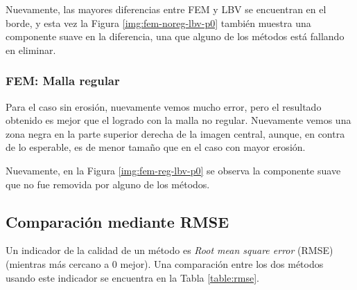 Nuevamente, las mayores diferencias entre FEM y LBV se encuentran en el borde, y esta vez la Figura \ref{img:fem-noreg-lbv-p0} también muestra una componente suave en la diferencia, una que alguno de los métodos está fallando en eliminar. 


\subsubsection{FEM: Malla regular}


Para el caso sin erosión, nuevamente vemos mucho error, pero el resultado obtenido es mejor que el logrado con la malla no regular. Nuevamente vemos una zona negra en la parte superior derecha de la imagen central, aunque, en contra de lo esperable, es de menor tamaño que en el caso con mayor erosión.


Nuevamente, en la Figura \ref{img:fem-reg-lbv-p0} se observa la componente suave que no fue removida por alguno de los métodos.
















\newpage
\subsection{Comparación mediante RMSE}

Un indicador de la calidad de un método es \textit{Root mean square error} (RMSE) (mientras más cercano a $0$ mejor). Una comparación entre los dos métodos usando este indicador se encuentra en la Tabla \ref{table:rmse}.

